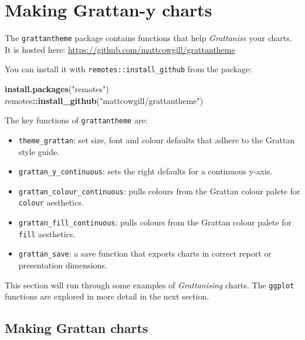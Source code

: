 \documentclass[]{book}
\newenvironment{Shaded}{\begin{snugshade}}{\end{snugshade}}
\newcommand{\KeywordTok}[1]{\textcolor[rgb]{0.13,0.29,0.53}{\textbf{#1}}}
\newcommand{\NormalTok}[1]{#1}
\newcommand{\OperatorTok}[1]{\textcolor[rgb]{0.81,0.36,0.00}{\textbf{#1}}}
\newcommand{\StringTok}[1]{\textcolor[rgb]{0.31,0.60,0.02}{#1}}
\providecommand{\tightlist}{%
  \setlength{\itemsep}{0pt}\setlength{\parskip}{0pt}}
\begin{document}
\hypertarget{making-grattan-y-charts}{%
\section{Making Grattan-y charts}\label{making-grattan-y-charts}}

The \texttt{grattantheme} package contains functions that help \emph{Grattanise} your charts. It is hosted here: \url{https://github.com/mattcowgill/grattantheme}

You can install it with \texttt{remotes::install\_github} from the package:

\begin{Shaded}
\begin{Highlighting}[]
\KeywordTok{install.packages}\NormalTok{(}\StringTok{"remotes"}\NormalTok{)}
\NormalTok{remotes}\OperatorTok{::}\KeywordTok{install_github}\NormalTok{(}\StringTok{"mattcowgill/grattantheme"}\NormalTok{)}
\end{Highlighting}
\end{Shaded}

The key functions of \texttt{grattantheme} are:

\begin{itemize}
\tightlist
\item
  \texttt{theme\_grattan}: set size, font and colour defaults that adhere to the Grattan style guide.
\item
  \texttt{grattan\_y\_continuous}: sets the right defaults for a continuous y-axis.
\item
  \texttt{grattan\_colour\_continuous}: pulls colours from the Grattan colour palete for \texttt{colour} aesthetics.
\item
  \texttt{grattan\_fill\_continuous}: pulls colours from the Grattan colour palete for \texttt{fill} aesthetics.
\item
  \texttt{grattan\_save}: a save function that exports charts in correct report or presentation dimensions.
\end{itemize}

This section will run through some examples of \emph{Grattanising} charts. The \texttt{ggplot} functions are explored in more detail in the next section.

\hypertarget{making-grattan-charts}{%
\subsection{Making Grattan charts}\label{making-grattan-charts}}
\end{document}
